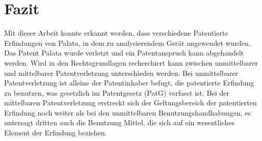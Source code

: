 \section{Fazit}\label{sec:Fazit}
Mit dieser Arbeit konnte erkannt werden, dass verschiedene Patentierte Erfindungen von Palata, in dem zu analysierendem Gerät angewendet wurden. Das Patent Palata wurde verletzt und ein Patentanspruch kann abgehandelt werden. Wird in den Rechtsgrundlagen recherchiert kann zwischen unmittelbarer und mittelbarer Patentverletzung unterschieden werden. Bei unmittelbarer Patentverletzung ist alleine der Patentinhaber befugt, die patentierte Erfindung zu benutzen, was gesetzlich im Patentgesetz (PatG) verfasst ist. Bei der mittelbaren Patentverletzung erstreckt sich der Geltungsbereich der patentierten Erfindung noch weiter als bei den unmittelbaren Benutzungshandhabungen, es untersagt dritten auch die Benutzung Mittel, die sich auf ein wesentliches Element der Erfindung beziehen.